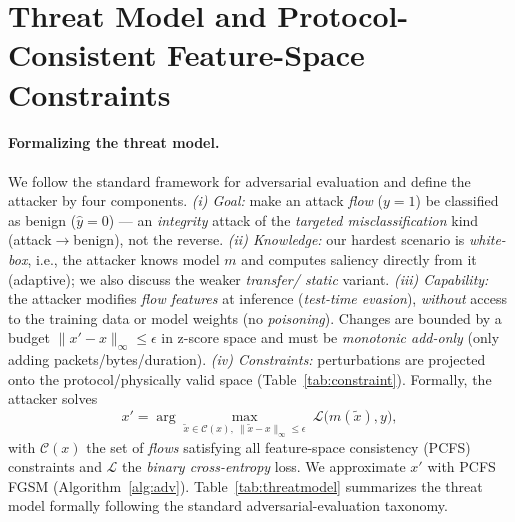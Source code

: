 \documentclass[preprint,12pt,authoryear]{elsarticle}
\begin{document}
\section{Threat Model and Protocol-Consistent Feature-Space Constraints}
\label{sec:ancaman}

\paragraph{Formalizing the threat model.} We follow the standard framework for
adversarial evaluation and define the attacker by four components. \emph{(i) Goal:}
make an attack \emph{flow} ($y=1$) be classified as benign ($\hat{y}=0$) --- an
\emph{integrity} attack of the \emph{targeted misclassification} kind
(attack$\rightarrow$benign), not the reverse. \emph{(ii) Knowledge:} our hardest
scenario is \emph{white-box}, i.e., the attacker knows model $m$ and computes
saliency directly from it (adaptive); we also discuss the weaker \emph{transfer/
static} variant. \emph{(iii) Capability:} the attacker modifies \emph{flow features}
at inference (\emph{test-time evasion}), \emph{without} access to the training data
or model weights (no \emph{poisoning}). Changes are bounded by a budget
$\lVert x' - x \rVert_\infty \le \epsilon$ in z-score space and must be
\emph{monotonic add-only} (only adding packets/bytes/duration). \emph{(iv)
Constraints:} perturbations are projected onto the protocol/physically valid space
(Table~\ref{tab:constraint}). Formally, the attacker solves
\begin{equation}
x' = \arg\max_{\tilde{x}\in \mathcal{C}(x),\ \lVert \tilde{x}-x\rVert_\infty \le \epsilon}
\ \mathcal{L}\big(m(\tilde{x}), y\big),
\end{equation}
with $\mathcal{C}(x)$ the set of \emph{flows} satisfying all feature-space
consistency (PCFS) constraints and $\mathcal{L}$ the \emph{binary cross-entropy}
loss. We approximate $x'$ with PCFS FGSM (Algorithm~\ref{alg:adv}).
Table~\ref{tab:threatmodel} summarizes the threat model formally following the
standard adversarial-evaluation taxonomy.
\end{document}
